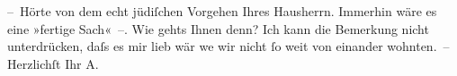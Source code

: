\begin{ledgroupsized}[t]{13cm}
           \pstart
           – Hörte von dem echt jüdiſchen Vorgehen Ihres Hausherrn. Immerhin wäre es eine »fertige Sach« –.\pend
           \pstart
           Wie gehts Ihnen denn? Ich kann die Bemerkung nicht unterdrücken, daſs es mir lieb wär
                  we{\geminationn} wir nicht ſo weit von einander wohnten. –
               Herzlichſt Ihr \spacefill\mbox{A.}\pend
           
         
         \endnumbering{}\end{ledgroupsized}  \newcommand{\dateiname}{L01467}\newcommand{\titel}{Arthur Schnitzler an Richard Beer-Hofmann, 8. 11. 1904}\newcommand{\editorInnen}{Martin Anton Müller und Gerd-Hermann Susen}
      